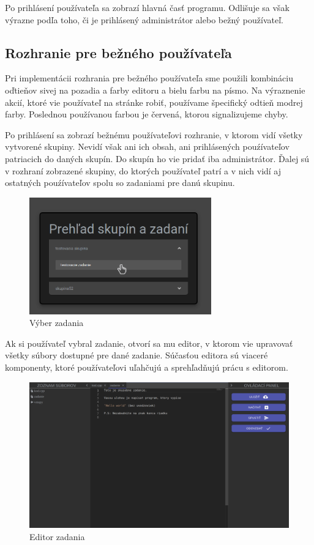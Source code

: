 Po prihlásení používateľa sa zobrazí hlavná časť programu. Odlišuje sa však výrazne podľa toho, či
je prihlásený administrátor alebo bežný používateľ.

\subsection{Rozhranie pre bežného používateľa}
Pri implementácii rozhrania pre bežného používateľa sme použili kombináciu oďtieňov sivej na pozadia
a farby editoru a bielu farbu na písmo. Na výraznenie akcií, ktoré vie používateľ na stránke robiť,
používame špecifický odtieň modrej farby. Poslednou používanou farbou je červená, ktorou
signalizujeme chyby.

Po prihlásení sa zobrazí bežnému používateľovi rozhranie, v ktorom vidí všetky vytvorené skupiny.
Nevidí však ani ich obsah, ani prihlásených pouźívateľov patriacich do daných skupín. Do skupín
ho vie pridať iba administrátor. Ďalej sú v rozhraní zobrazené skupiny, do ktorých používateľ patrí
a v nich vidí aj ostatných pouźívateľov spolu so zadaniami pre danú skupinu.
\begin{figure}[H]
\centerline{\includegraphics[width=0.7\textwidth]{images/vyber_zadania}}
\caption[Výber zadania]{Výber zadania}
\label{obr:vyber_zadania}
\end{figure}

Ak si používateľ vybral zadanie, otvorí sa mu editor, v ktorom vie upravovať všetky súbory dostupné
pre dané zadanie. Súčasťou editora sú viaceré komponenty, ktoré používateľovi uľahčujú a
sprehľadňujú prácu s editorom. 
\begin{figure}[H]
\centerline{\includegraphics[width=1\textwidth]{images/bezny_pouzivatel}}
\caption[Editor zadania]{Editor zadania}
\label{obr:bezny_pouzivatel}
\end{figure}

